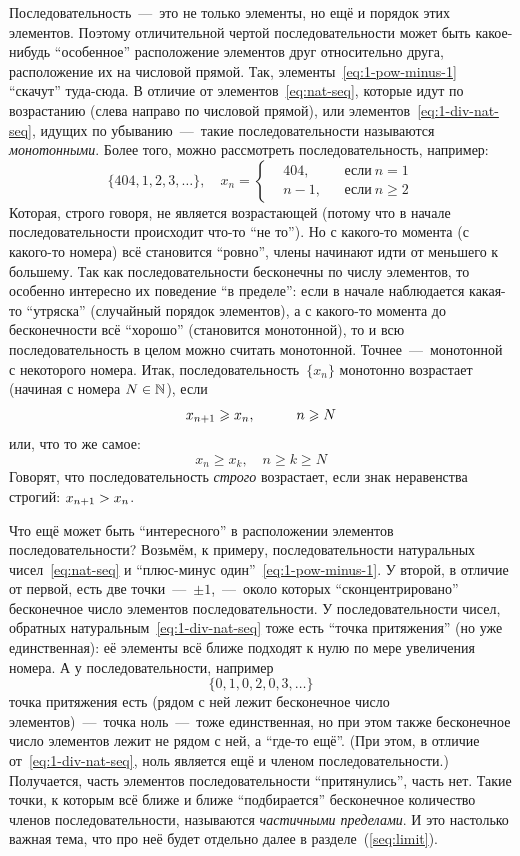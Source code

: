 \documentclass[a4paper,12pt]{article}
\begin{document}
  Последовательность~---~это не только элементы, но ещё и порядок этих элементов.
  Поэтому отличительной чертой последовательности может быть какое-нибудь ``особенное'' расположение элементов друг относительно друга, расположение их на числовой прямой.
  Так, элементы~\eqref{eq:1-pow-minus-1} ``скачут'' туда-сюда.
  В отличие от элементов~\eqref{eq:nat-seq}, которые идут по возрастанию (слева направо по числовой прямой), или элементов~\eqref{eq:1-div-nat-seq}, идущих по убыванию~---~такие последовательности называются \emph{монотонными}.
  Более того, можно рассмотреть последовательность, например:
  \[
    \{404, 1, 2, 3, \ldots\},\quad x_n = \left\{
      \begin{aligned}
        &404, & &\mbox{если}\ n = 1\\
        &n - 1, & &\mbox{если}\ n \geq 2
      \end{aligned}
    \right.
  \]
  Которая, строго говоря, не является возрастающей (потому что в начале последовательности происходит что-то ``не то'').
  Но с какого-то момента (с какого-то номера) всё становится ``ровно'', члены начинают идти от меньшего к большему.
  Так как последовательности бесконечны по числу элементов, то особенно интересно их поведение ``в пределе'': если в начале наблюдается какая-то ``утряска'' (случайный порядок элементов), а с какого-то момента до бесконечности всё ``хорошо'' (становится монотонной), то и всю последовательность в целом можно считать монотонной.
  Точнее~---~монотонной с некоторого номера.
  Итак, последовательность~$\{x_n\}$ монотонно возрастает (начиная с номера $N \hm\in \NN$), если
  \[
    x_{n + 1} \geq x_n,\quad \hphantom{n \geq {}} n \geq N
  \]
  или, что то же самое:
  \[
    x_n \geq x_k,\quad n \geq k \geq N
  \]
  Говорят, что последовательность \emph{строго} возрастает, если знак неравенства строгий: $x_{n + 1} \hm> x_n$.
  
  Что ещё может быть ``интересного'' в расположении элементов последовательности?
  Возьмём, к примеру, последовательности натуральных чисел~\eqref{eq:nat-seq} и ``плюс-минус один''~\eqref{eq:1-pow-minus-1}.
  У второй, в отличие от первой, есть две точки~---~$\pm 1$,~---~около которых ``сконцентрировано'' бесконечное число элементов последовательности.
  У последовательности чисел, обратных натуральным~\eqref{eq:1-div-nat-seq} тоже есть ``точка притяжения'' (но уже единственная): её элементы всё ближе подходят к нулю по мере увеличения номера.
  А у последовательности, например
  \[
    \{0, 1, 0, 2, 0, 3, \ldots\}
  \]
  точка притяжения есть (рядом с ней лежит бесконечное число элементов)~---~точка ноль~---~тоже единственная, но при этом также бесконечное число элементов лежит не рядом с ней, а ``где-то ещё''.
  (При этом, в отличие от~\eqref{eq:1-div-nat-seq}, ноль является ещё и членом последовательности.)
  Получается, часть элементов последовательности ``притянулись'', часть нет.
  Такие точки, к которым всё ближе и ближе ``подбирается'' бесконечное количество членов последовательности, называются \emph{частичными пределами}.
  И это настолько важная тема, что про неё будет отдельно далее в разделе~(\ref{seq:limit}).
  
\end{document}
